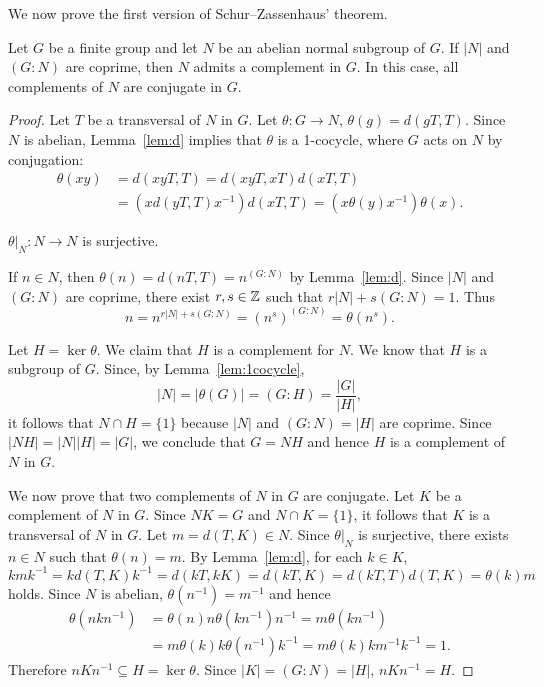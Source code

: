 We now prove the first version of Schur--Zassenhaus' theorem. 

\begin{theorem}
	\label{thm:SchurZassenhaus:abelian}
	Let $G$ be a finite group and let $N$ be an abelian normal subgroup of $G$. If 
	$|N|$ and $(G:N)$ are coprime, then $N$ admits a complement in $G$. In this case, all complements
	of $N$ are conjugate in $G$.  
\end{theorem}

\begin{proof}
	Let $T$ be a transversal of $N$ in $G$. Let $\theta\colon G\to N$,
	$\theta(g)=d(gT,T)$. Since $N$ is abelian, Lemma~\ref{lem:d} implies that 
	$\theta$ is a 1-cocycle, where $G$ acts on $N$ by conjugation: 
	\begin{align*}
		\theta(xy)&=d(xyT,T)
		=d(xyT,xT)d(xT,T)\\
		&=(xd(yT,T)x^{-1})d(xT,T)=(x \theta(y)x^{-1})\theta(x).
	\end{align*}

	\begin{claim}
		$\theta|_N\colon N\to N$ is surjective.
	\end{claim}

	If $n\in N$, then  
	$\theta(n)=d(nT,T)=n^{(G:N)}$ by Lemma~\ref{lem:d}. Since $|N|$ and $(G:N)$ are coprime, 
	there exist $r,s\in\mathbb{Z}$ such that $r|N|+s(G:N)=1$. Thus
	\[
		n=n^{r|N|+s(G:N)}=(n^s)^{(G:N)}=\theta(n^s).
	\]

	Let $H=\ker\theta$. We claim that $H$ is a complement for $N$. 
	We know that $H$ is a subgroup of $G$. Since, by Lemma~\ref{lem:1cocycle},  
	\[
		|N|=|\theta(G)|=(G:H)=\frac{|G|}{|H|},
	\]
	 it follows that $N\cap H=\{1\}$ because 
	$|N|$ and $(G:N)=|H|$ are coprime. Since $|NH|=|N||H|=|G|$, we conclude that 
	$G=NH$ and hence $H$ is a complement of $N$ in $G$.

	We now prove that two complements of $N$ in $G$ are conjugate. Let  
	$K$ be a complement of $N$ in $G$. Since $NK=G$ and $N\cap K=\{1\}$, it follows that 
	$K$ is a transversal of $N$ in $G$. Let $m=d(T,K)\in N$. Since $\theta|_N$ is surjective, 
	there exists $n\in N$ such that $\theta(n)=m$. By 
	Lemma~\ref{lem:d}, for each $k\in K$, 
	\[
	kmk^{-1}=kd(T,K)k^{-1}=d(kT,kK)=d(kT,K)=d(kT,T)d(T,K)=\theta(k)m
	\]
	holds. Since $N$ is abelian,
	$\theta(n^{-1})=m^{-1}$ and hence  
	\begin{align*}
		\theta(nkn^{-1})&=\theta(n)n\theta(kn^{-1})n^{-1}
		=m\theta(kn^{-1})\\
		&=m\theta(k)k\theta(n^{-1})k^{-1}
		=m\theta(k)km^{-1}k^{-1}=1.
	\end{align*}
	Therefore $nKn^{-1}\subseteq H=\ker\theta$. Since
	$|K|=(G:N)=|H|$, $nKn^{-1}=H$.
\end{proof}

